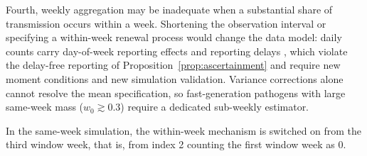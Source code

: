 Fourth, weekly aggregation may be inadequate when a substantial share of transmission occurs within
a week. Shortening the observation interval or specifying a within-week renewal process would change
the data model: daily counts carry day-of-week reporting effects and reporting delays
\citep{lison2024nowcast}, which violate the delay-free reporting of
Proposition~\ref{prop:ascertainment} and require new moment conditions and new simulation
validation. Variance corrections alone cannot resolve the mean specification, so fast-generation pathogens with
large same-week mass ($w_0\gtrsim 0.3$) require a dedicated sub-weekly estimator.

In the same-week simulation, the within-week mechanism is switched on from the third window week,
that is, from index 2 counting the first window week as 0.


